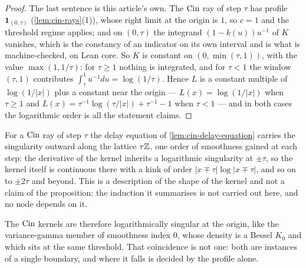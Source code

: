 \begin{proof}
The last sentence is this article's own. The $\operatorname{Cin}$ ray of step $\tau$ has profile
$\mathbf 1_{(0,\tau)}$ (\ref{lem:cin-rays}(1)), whose right limit at the origin is $1$, so
$c = 1$ and the threshold regime applies; and on $(0,\tau)$ the integrand $(1 - k(u))u^{-1}$ of
$K$ vanishes, which is the constancy of an indicator on its own interval and is what is
machine-checked, on Lean core. So $K$ is constant on $(0,\min(\tau,1))$, with the value
$\max(1,1/\tau)$: for $\tau \ge 1$ nothing is integrated, and for $\tau < 1$ the window $(\tau,1)$
contributes $\int_\tau^1 u^{-1}du = \log(1/\tau)$. Hence $L$ is a constant multiple of
$\log(1/|x|)$ plus a constant near the origin --- $L(x) = \log(1/|x|)$ when $\tau \ge 1$ and
$L(x) = \tau^{-1}\log(\tau/|x|) + \tau^{-1} - 1$ when $\tau < 1$ --- and in both cases the
logarithmic order is all the statement claims.
\end{proof}

\begin{remark}\label{rem:cin-propagation}
For a $\operatorname{Cin}$ ray of step $\tau$ the delay equation of \ref{lem:cin-delay-equation} carries the
singularity outward along the lattice $\tau\mathbb{Z}$, one order of smoothness gained at each step:
the derivative of the kernel inherits a logarithmic singularity at $\pm\tau$, so the kernel
itself is continuous there with a kink of order $|x \mp \tau|\log|x \mp \tau|$, and so on to
$\pm2\tau$ and beyond. This is a description of the shape of the kernel and not a claim of the
proposition: the induction it summarises is not carried out here, and no node depends on it.
\end{remark}

The $\operatorname{Cin}$ kernels are therefore logarithmically singular at the origin, like the
variance-gamma member of smoothness index $0$, whose density is a Bessel $K_0$ and which sits
at the same threshold. That coincidence is not one: both are instances of a single boundary,
and where it falls is decided by the profile alone.

